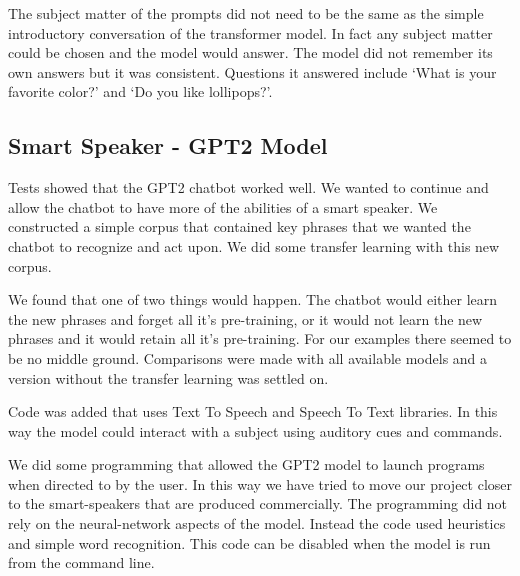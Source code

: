 The subject matter of the prompts did not need to be the
same as the simple introductory conversation of the transformer model. In fact any subject matter
could be chosen and the model would answer. The model did not remember its own answers but it
was consistent. Questions it answered include `What is your favorite color?' and `Do you like lollipops?'. 

\subsection{Smart Speaker - GPT2 Model}
Tests showed that the GPT2 chatbot worked well. We wanted to continue and allow the chatbot to
have more of the abilities of a smart speaker. We constructed a simple corpus that contained
key phrases that we wanted the chatbot to recognize and act upon. We did some transfer learning
with this new corpus.

We found that one of two things would happen. The chatbot would either learn the new phrases and forget all it's pre-training, or it would not learn the new phrases and it would retain all it's 
pre-training. For our examples there seemed to be no middle ground. Comparisons were made with 
all available models and a version without the transfer learning was settled on.

Code was added that uses Text To Speech and Speech To Text libraries. In this way the model could
interact with a subject using auditory cues and commands.

We did some programming that allowed the GPT2 model to launch programs when directed to by
the user. In this way we have tried to move our project closer to the smart-speakers that
are produced commercially. The programming did not rely on the neural-network aspects of the
model. Instead the code used heuristics and simple word recognition. This code can be disabled
when the model is run from the command line.


